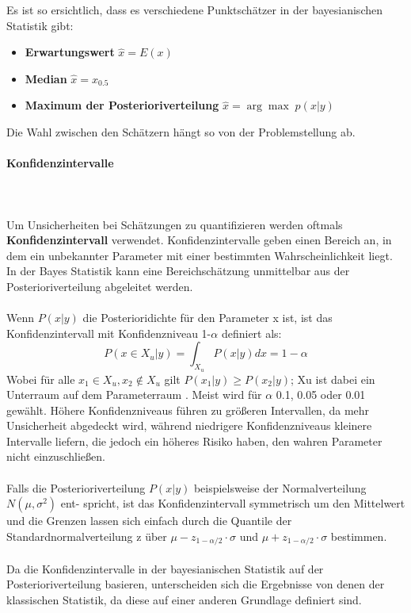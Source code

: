 \documentclass[a4paper,12pt]{article}
\begin{document}
Es ist so ersichtlich, dass es verschiedene Punktschätzer in der bayesianischen Statistik gibt:
\begin{itemize}
  \item \textbf{Erwartungswert} $\hat{x} = E(x)$
  \item \textbf{Median} $\hat{x} = x_{0.5}$
  \item \textbf{Maximum der Posterioriverteilung} $\hat{x} = \arg \max \; p(x|y)$
\end{itemize}
Die Wahl zwischen den Schätzern hängt so von der Problemstellung ab.

\paragraph{Konfidenzintervalle} \mbox{}\\\\
Um Unsicherheiten bei Schätzungen zu quantifizieren werden oftmals \textbf{Konfidenzintervall} verwendet. Konfidenzintervalle geben einen Bereich an, in dem ein unbekannter Parameter mit einer bestimmten Wahrscheinlichkeit liegt. In der Bayes Statistik kann eine Bereichschätzung unmittelbar aus der Posterioriverteilung abgeleitet werden. \parencite[71]{EinfBayesStatistik} \\\\
Wenn $P(x | y)$ die Posterioridichte für den Parameter x ist, ist das Konfidenzintervall mit Konfidenzniveau 1-$\alpha$ definiert als:
\begin{equation}
  P(x \in X_u|y) = \int_{X_u} P(x|y) dx = 1-\alpha
\end{equation}
Wobei für alle $x_1 \in X_u, x_2 \not\in X_u$ gilt $P(x_1|y) \geq P(x_2|y)$; Xu ist dabei ein Unterraum auf dem Parameterraum \parencite[71]{EinfBayesStatistik}. Meist wird für $\alpha$ 0.1, 0.05 oder 0.01 gewählt. Höhere Konfidenzniveaus führen zu größeren Intervallen, da mehr Unsicherheit abgedeckt wird, während niedrigere Konfidenzniveaus kleinere Intervalle liefern, die jedoch ein höheres Risiko haben, den wahren Parameter nicht einzuschließen. \\\\
Falls die Posterioriverteilung $P(x | y)$ beispielsweise der Normalverteilung $N(\mu,\sigma^2)$ ent- spricht, ist das Konfidenzintervall symmetrisch um den Mittelwert und die Grenzen lassen sich einfach durch die Quantile der Standardnormalverteilung z über $\mu - z_{1-\alpha/2} \cdot \sigma$ und $\mu + z_{1-\alpha/2} \cdot \sigma$ bestimmen.\\\\
Da die Konfidenzintervalle in der bayesianischen Statistik auf der Posterioriverteilung basieren, unterscheiden sich die Ergebnisse von denen der klassischen Statistik, da diese auf einer anderen Grundlage definiert sind.
\end{document}
